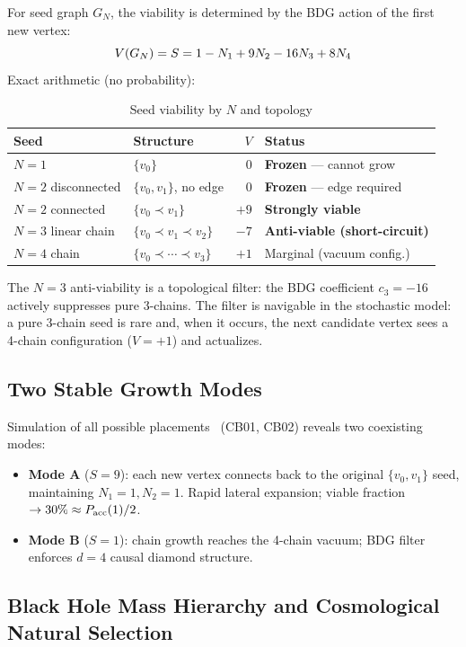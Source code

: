 \documentclass[12pt,a4paper]{article}
\begin{document}
For seed graph $G_N$, the viability is determined by the BDG action of the first new vertex:
\begin{equation}
  V(G_N) = S = 1 - N_1 + 9N_2 - 16N_3 + 8N_4
  \label{eq:viability}
\end{equation}
Exact arithmetic (no probability):
\begin{table}[h]
\centering
\caption{Seed viability by $N$ and topology}
\label{tab:seeds}
\begin{tabular}{llrl}
\toprule
Seed & Structure & $V$ & Status \\
\midrule
$N=1$ & $\{v_0\}$ & $0$ & \textbf{Frozen} — cannot grow \\
$N=2$ disconnected & $\{v_0,v_1\}$, no edge & $0$ & \textbf{Frozen} — edge required \\
$N=2$ connected & $\{v_0 \prec v_1\}$ & $+9$ & \textbf{Strongly viable} \\
$N=3$ linear chain & $\{v_0\prec v_1\prec v_2\}$ & $-7$ & \textbf{Anti-viable (short-circuit)} \\
$N=4$ chain & $\{v_0\prec\cdots\prec v_3\}$ & $+1$ & Marginal (vacuum config.) \\
\bottomrule
\end{tabular}
\end{table}

The $N=3$ anti-viability is a topological filter: the BDG coefficient $c_3 = -16$ actively suppresses pure 3-chains.  The filter is navigable in the stochastic model: a pure 3-chain seed is rare and, when it occurs, the next candidate vertex sees a 4-chain configuration ($V=+1$) and actualizes.

\subsection{Two Stable Growth Modes}

Simulation of all possible placements \statusDR\ (CB01, CB02) reveals two coexisting modes:
\begin{itemize}
  \item \textbf{Mode A} ($S=9$): each new vertex connects back to the original $\{v_0,v_1\}$ seed, maintaining $N_1=1, N_2=1$.  Rapid lateral expansion; viable fraction $\to 30\% \approx P_{\mathrm{acc}}(1)/2$.
  \item \textbf{Mode B} ($S=1$): chain growth reaches the 4-chain vacuum; BDG filter enforces $d=4$ causal diamond structure.
\end{itemize}

\subsection{Black Hole Mass Hierarchy and Cosmological Natural Selection}
\end{document}
